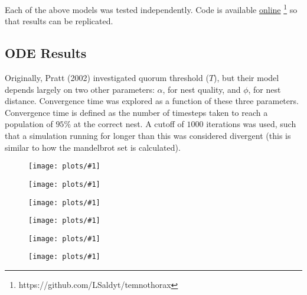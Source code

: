 \documentclass{article}
\newcommand{\plot}[3]{
    \begin{figure}[h]
        \texttt{[image: plots/\#1]}
        \caption{#2}
        \label{fig:#1}
    \end{figure}
}
\begin{document}
Each of the above models was tested independently. Code is available \href{https://github.com/LSaldyt/temnothorax}{online} \footnote{https://github.com/LSaldyt/temnothorax} so that results can be replicated. 

\subsection{ODE Results}
Originally, Pratt (2002) investigated quorum threshold ($T$), but their model depends largely on two other parameters: $\alpha$, for nest quality, and $\phi$, for nest distance.
Convergence time was explored as a function of these three parameters. 
Convergence time is defined as the number of timesteps taken to reach a population of $95\%$ at the correct nest.
A cutoff of $1000$ iterations was used, such that a simulation running for longer than this was considered divergent (this is similar to how the mandelbrot set is calculated).

\plot{passive_populations_pratt_2002}{}{0.6}
\plot{active_populations_pratt_2002.png}{}{0.6}
\plot{passive_populations_saldyt_2018_alt}{}{0.6}
\plot{active_populations_saldyt_2018_alt}{}{0.6}
\plot{quality_ode_convergence_times}{}{0.6}
\plot{distance_ode_convergence_times}{}{0.6}

% 
% 
% 
% 
\end{document}
